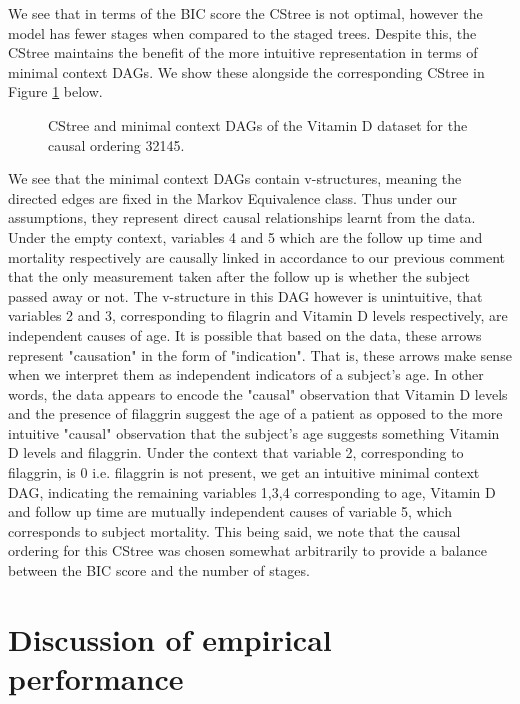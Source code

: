 \documentclass{tufte-book}
\begin{document}
We see that in terms of the BIC score the CStree is not optimal, however the model has fewer stages when compared to the staged trees. Despite this, the CStree maintains the benefit of the more intuitive representation in terms of minimal context DAGs. We show these alongside the corresponding CStree in Figure \ref{fig:vitd_mcdags} below.

\begin{figure}[!h]\label{fig:vitd_mcdags}
   \begin{floatrow}
%
\caption{ CStree and minimal context DAGs of the Vitamin D dataset for the causal ordering 32145. }
        
   \end{floatrow}
\end{figure}


We see that the minimal context DAGs contain v-structures, meaning the directed edges are fixed in the Markov Equivalence class. Thus under our assumptions, they represent direct causal relationships learnt from the data. Under the empty context, variables 4 and 5 which are the follow up time and mortality respectively are causally linked in accordance to our previous comment that the only measurement taken after the follow up is whether the subject passed away or not. The v-structure in this DAG however is unintuitive, that variables 2 and 3, corresponding to filagrin and Vitamin D levels respectively, are independent causes of age. It is possible that based on the data, these arrows represent "causation" in the form of "indication". That is, these arrows make sense when we interpret them as independent indicators of a subject's age. In other words, the data appears to encode the "causal" observation that Vitamin D levels and the presence of filaggrin suggest the age of a patient as opposed to the more intuitive "causal" observation that the subject's age suggests something Vitamin D levels and filaggrin. Under the context that variable 2, corresponding to filaggrin, is 0 i.e. filaggrin is not present, we get an intuitive minimal context DAG, indicating the remaining variables 1,3,4 corresponding to age, Vitamin D and follow up time are mutually independent causes of variable 5, which corresponds to subject mortality. This being said, we note that the causal ordering for this CStree was chosen somewhat arbitrarily to provide a balance between the BIC score and the number of stages.


\section{Discussion of empirical performance}
\label{sec:orgb43c4c9}
\end{document}
